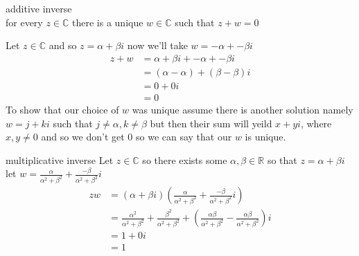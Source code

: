 \documentclass[11pt]{book}
\begin{document}
\begin{ver}
    additive inverse\\
    for every $z \in \mathbb{C}$ there is a unique $w \in \mathbb{C}$ such that $z + w = 0$ 

    Let $z \in \mathbb{C}$ and so $z = \alpha + \beta i$ now we'll take $w = -\alpha  + -\beta  i$ 
    \begin{align*}
        z + w &= \alpha + \beta i + -\alpha  + -\beta  i\\
              &= \left( \alpha -\alpha  \right) + \left( \beta - \beta  \right)i\\
              &=0 + 0 i\\
              &=0
    \end{align*}
    To show that our choice of $w$ was unique assume there is another solution namely $w = j + k i$ such that $j \neq \alpha , k \neq \beta $ but then their sum will yeild $x + y i$,  where $x,y \neq 0$ and so we don't get $0$ so we can say that our $w$ is unique.
\end{ver}

\begin{ver}
    multiplicative inverse
    Let $z \in \mathbb{C}$ so there exists some $\alpha, \beta \in \mathbb{R}$ so that $z = \alpha + \beta i$   let $w = \frac{\alpha}{\alpha^2 + \beta^2} + \frac{-\beta}{\alpha^2 + \beta^2} i$ 
    \begin{align*}
        zw &= \left( \alpha + \beta i \right)\left( \frac{\alpha}{\alpha^2 + \beta^2} + \frac{-\beta}{\alpha^2 + \beta^2}i \right)\\
           &= \frac{\alpha^2}{\alpha^2 + \beta^2} + \frac{\beta^2}{\alpha^2 + \beta^2} + \left( \frac{\alpha \beta }{\alpha^2 + \beta^2} - \frac{\alpha \beta }{\alpha^2 + \beta^2} \right)i\\
           &= 1 + 0i\\
           &=1
    \end{align*}
\end{ver}
\end{document}
